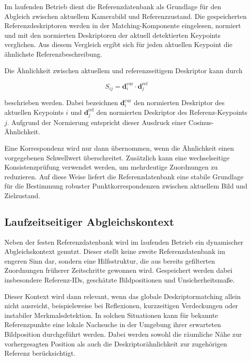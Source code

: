 Im laufenden Betrieb dient die Referenzdatenbank als Grundlage für den Abgleich zwischen aktuellem Kamerabild und Referenzzustand. Die gespeicherten Referenzdeskriptoren werden in der Matching-Komponente eingelesen, normiert und mit den normierten Deskriptoren der aktuell detektierten Keypoints verglichen. Aus diesem Vergleich ergibt sich für jeden aktuellen Keypoint die ähnlichste Referenzbeschreibung.

Die Ähnlichkeit zwischen aktuellem und referenzseitigem Deskriptor kann durch

\begin{equation}
S_{ij} = \mathbf{d}^{\mathrm{cur}}_i \cdot \mathbf{d}^{\mathrm{ref}}_j
\end{equation}

beschrieben werden. Dabei bezeichnen $\mathbf{d}^{\mathrm{cur}}_i$ den normierten Deskriptor des aktuellen Keypoints $i$ und $\mathbf{d}^{\mathrm{ref}}_j$ den normierten Deskriptor des Referenz-Keypoints $j$. Aufgrund der Normierung entspricht dieser Ausdruck einer Cosinus-Ähnlichkeit.

Eine Korrespondenz wird nur dann übernommen, wenn die Ähnlichkeit einen vorgegebenen Schwellwert überschreitet. Zusätzlich kann eine wechselseitige Konsistenzprüfung verwendet werden, um mehrdeutige Zuordnungen zu reduzieren. Auf diese Weise liefert die Referenzdatenbank eine stabile Grundlage für die Bestimmung robuster Punktkorrespondenzen zwischen aktuellem Bild und Zielzustand.

\subsection{Laufzeitseitiger Abgleichskontext}
\label{subsec:laufzeitseitiger_abgleichskontext}

Neben der festen Referenzdatenbank wird im laufenden Betrieb ein dynamischer Abgleichskontext genutzt. Dieser stellt keine zweite Referenzdatenbank im engeren Sinn dar, sondern eine Hilfsstruktur, die aus bereits gefilterten Zuordnungen früherer Zeitschritte gewonnen wird. Gespeichert werden dabei insbesondere Referenz-IDs, geschätzte Bildpositionen und Unsicherheitsmaße.

Dieser Kontext wird dann relevant, wenn das globale Deskriptormatching allein nicht ausreicht, beispielsweise bei Reflexionen, kurzzeitigen Verdeckungen oder instabiler Merkmalsdetektion. In solchen Situationen kann für bekannte Referenzpunkte eine lokale Nachsuche in der Umgebung ihrer erwarteten Bildposition durchgeführt werden. Dabei werden sowohl die räumliche Nähe zur vorhergesagten Position als auch die Deskriptorähnlichkeit zur zugehörigen Referenz berücksichtigt.

